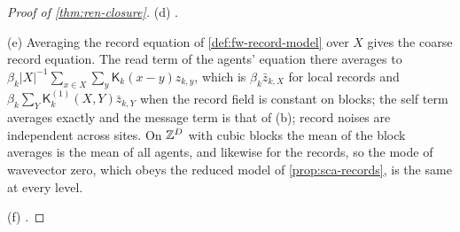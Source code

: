 \begin{proof}[Proof of \cref{thm:ren-closure}]
(d) .

(e) Averaging the record equation of \cref{def:fw-record-model} over $X$ gives the coarse record equation. The read term of the agents' equation there averages to $\beta_k\lvert X\rvert^{-1}\sum_{x\in X}\sum_y\mathsf K_k(x-y)z_{k,y}$, which is $\beta_k\bar z_{k,X}$ for local records and $\beta_k\sum_Y\mathsf K^{(1)}_k(X,Y)\bar z_{k,Y}$ when the record field is constant on blocks; the self term averages exactly and the message term is that of (b); record noises are independent across sites. On $\mathbb{Z}^D$ with cubic blocks the mean of the block averages is the mean of all agents, and likewise for the records, so the mode of wavevector zero, which obeys the reduced model of \cref{prop:sca-records}, is the same at every level.

(f) .
\end{proof}
